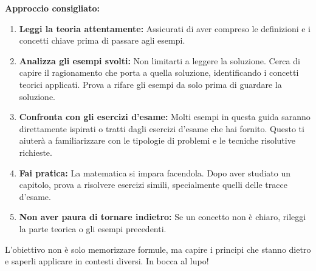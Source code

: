 \textbf{Approccio consigliato:}
\begin{enumerate}
    \item \textbf{Leggi la teoria attentamente:} Assicurati di aver compreso le definizioni e i concetti chiave prima di passare agli esempi.
    \item \textbf{Analizza gli esempi svolti:} Non limitarti a leggere la soluzione. Cerca di capire il ragionamento che porta a quella soluzione, identificando i concetti teorici applicati. Prova a rifare gli esempi da solo prima di guardare la soluzione.
    \item \textbf{Confronta con gli esercizi d'esame:} Molti esempi in questa guida saranno direttamente ispirati o tratti dagli esercizi d'esame che hai fornito. Questo ti aiuterà a familiarizzare con le tipologie di problemi e le tecniche risolutive richieste.
    \item \textbf{Fai pratica:} La matematica si impara facendola. Dopo aver studiato un capitolo, prova a risolvere esercizi simili, specialmente quelli delle tracce d'esame.
    \item \textbf{Non aver paura di tornare indietro:} Se un concetto non è chiaro, rileggi la parte teorica o gli esempi precedenti.
\end{enumerate}
L'obiettivo non è solo memorizzare formule, ma capire i principi che stanno dietro e saperli applicare in contesti diversi. In bocca al lupo!

